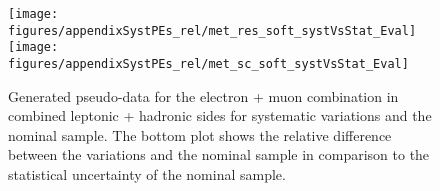 \begin{figure}[!hb]
\begin{center}
        
        \texttt{[image: figures/appendixSystPEs\_rel/met\_res\_soft\_systVsStat\_Eval]}\\
        \texttt{[image: figures/appendixSystPEs\_rel/met\_sc\_soft\_systVsStat\_Eval]}\\
  
\caption{Generated pseudo-data for the electron + muon combination in combined leptonic + hadronic sides for systematic variations and the nominal \ttbar sample. The bottom plot shows the relative difference between the variations and the nominal sample in comparison to the statistical uncertainty of the nominal sample.}   
\label{fig:systematicVar_lephad_MET}
\end{center}                          
\end{figure}

\clearpage
